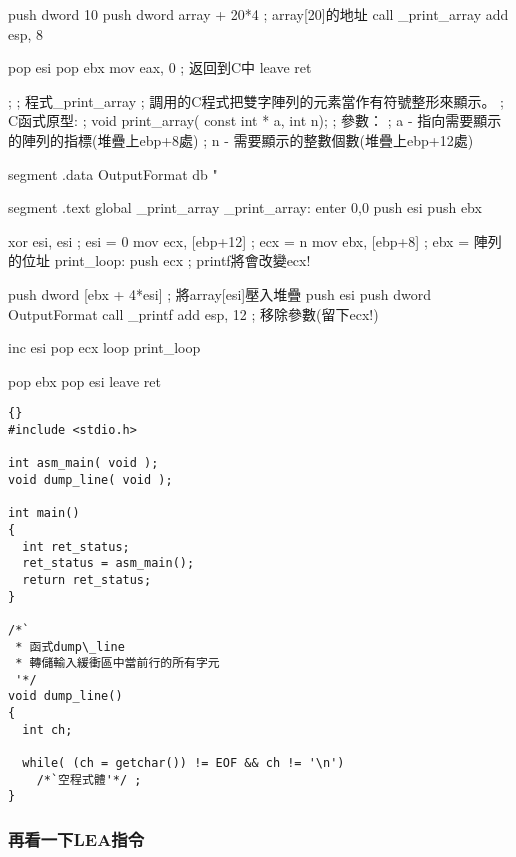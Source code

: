 \begin{AsmCodeListing}[label=array1.asm]
        push    dword 10
        push    dword array + 20*4     ; array[20]的地址
        call    _print_array
        add     esp, 8

        pop     esi
        pop     ebx
        mov     eax, 0            ; 返回到C中
        leave
        ret

;
; 程式_print_array
; 調用的C程式把雙字陣列的元素當作有符號整形來顯示。
; C函式原型:
; void print_array( const int * a, int n);
; 參數：
;   a - 指向需要顯示的陣列的指標(堆疊上ebp+8處)
;   n - 需要顯示的整數個數(堆疊上ebp+12處)

segment .data
OutputFormat    db   "%

segment .text
        global  _print_array
_print_array:
        enter   0,0
        push    esi
        push    ebx

        xor     esi, esi                  ; esi = 0
        mov     ecx, [ebp+12]             ; ecx = n
        mov     ebx, [ebp+8]              ; ebx = 陣列的位址
print_loop:
        push    ecx                       ; printf將會改變ecx!

        push    dword [ebx + 4*esi]       ; 將array[esi]壓入堆疊
        push    esi
        push    dword OutputFormat
        call    _printf
        add     esp, 12                   ; 移除參數(留下ecx!)

        inc     esi
        pop     ecx
        loop    print_loop

        pop     ebx
        pop     esi
        leave
        ret
\end{AsmCodeListing}

\lstset{escapeinside=`',language=Pascal,%
}
\begin{lstlisting}{}
#include <stdio.h>

int asm_main( void );
void dump_line( void );

int main()
{
  int ret_status;
  ret_status = asm_main();
  return ret_status;
}

/*`
 * 函式dump\_line
 * 轉儲輸入緩衝區中當前行的所有字元
 '*/
void dump_line()
{
  int ch;

  while( (ch = getchar()) != EOF && ch != '\n')
    /*`空程式體'*/ ;
}
\end{lstlisting}

\subsubsection{再看一下{\code LEA}指令}

